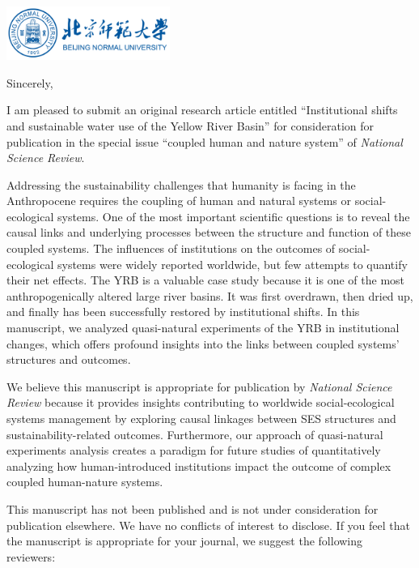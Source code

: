 \documentclass[11pt,a4paper,roman]{moderncv}
\begin{document}
\begin{minipage}[t]{\textwidth}
\includegraphics[width=0.40\textwidth]{bnu}
\end{minipage}


\opening{\vspace*{-2em}}
\closing{Sincerely,}{\vspace*{-2em}}
\makelettertitle

I am pleased to submit an original research article entitled ``Institutional shifts and sustainable water use of the Yellow River Basin'' for consideration for publication in the special issue ``coupled human and nature system'' of \textit{National Science Review}.

Addressing the sustainability challenges that humanity is facing in the Anthropocene requires the coupling of human and natural systems or social-ecological systems. One of the most important scientific questions is to reveal the causal links and underlying processes between the structure and function of these coupled systems. The influences of institutions on the outcomes of social-ecological systems were widely reported worldwide, but few attempts to quantify their net effects. The YRB is a valuable case study because it is one of the most anthropogenically altered large river basins. It was first overdrawn, then dried up, and finally has been successfully restored by institutional shifts. In this manuscript, we analyzed quasi-natural experiments of the YRB in institutional changes, which offers profound insights into the links between coupled systems' structures and outcomes.

We believe this manuscript is appropriate for publication by \textit{National Science Review} because it provides insights contributing to worldwide social-ecological systems management by exploring causal linkages between SES structures and sustainability-related outcomes. Furthermore, our approach of quasi-natural experiments analysis creates a paradigm for future studies of quantitatively analyzing how human-introduced institutions impact the outcome of complex coupled human-nature systems.

This manuscript has not been published and is not under consideration for publication elsewhere.  We have no conflicts of interest to disclose. If you feel that the manuscript is appropriate for your journal, we suggest the following reviewers:
\end{document}
